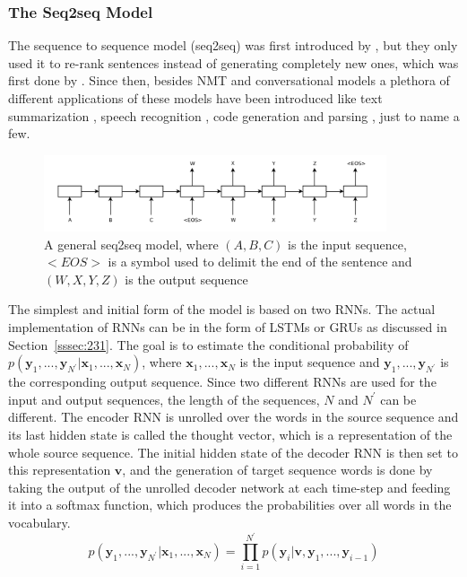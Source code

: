 \documentclass[12pt]{article}
\begin{document}
\subsubsection{The Seq2seq Model} \label{sssec:232}
The sequence to sequence model (seq2seq) was first introduced by \cite{Cho:2014}, but they only used it to re-rank sentences instead of generating completely new ones, which was first done by \cite{Sutskever:2014}. Since then, besides NMT and conversational models a plethora of different applications of these models have been introduced like text summarization \cite{Nallapati:2016}, speech recognition \cite{Chiu:2017}, code generation \cite{Rico:2017} and parsing \cite{Konstas:2017}, just to name a few.

\begin{figure}[H]
	\centering
	\includegraphics[width=0.9\textwidth]{pics/seq2seq.png}
	\caption{A general seq2seq model, where \((A,B,C)\) is the input sequence, \(<EOS>\) is a symbol used to delimit the end of the sentence and \((W,X,Y,Z)\) is the output sequence \cite{Sutskever:2014}}
	\label{fig:232a}
\end{figure}

The simplest and initial form of the model is based on two RNNs. The actual implementation of RNNs can be in the form of LSTMs or GRUs as discussed in Section~\ref{sssec:231}. The goal is to estimate the conditional probability of \(p(\bm{y}_1,...,\bm{y}_{N^{'}}|\bm{x}_1,...,\bm{x}_N)\), where \(\bm{x}_1,...,\bm{x}_N\) is the input sequence and \(\bm{y}_1,...,\bm{y}_{N^{'}}\) is the corresponding output sequence. Since two different RNNs are used for the input and output sequences, the length of the sequences, \(N\) and \(N^{'}\) can be different. The encoder RNN is unrolled over the words in the source sequence and its last hidden state is called the thought vector, which is a representation of the whole source sequence. The initial hidden state of the decoder RNN is then set to this representation \(\bm{v}\), and the generation of target sequence words is done by taking the output of the unrolled decoder network at each time-step and feeding it into a softmax function, which produces the probabilities over all words in the vocabulary.
\begin{equation} \label{eq232a}
p(\bm{y}_1,...,\bm{y}_{N^{'}}|\bm{x}_1,...,\bm{x}_N)=\prod_{i=1}^{N^{'}}p(\bm{y}_i|\bm{v},\bm{y}_1,...,\bm{y}_{i-1})
\end{equation}
\end{document}
